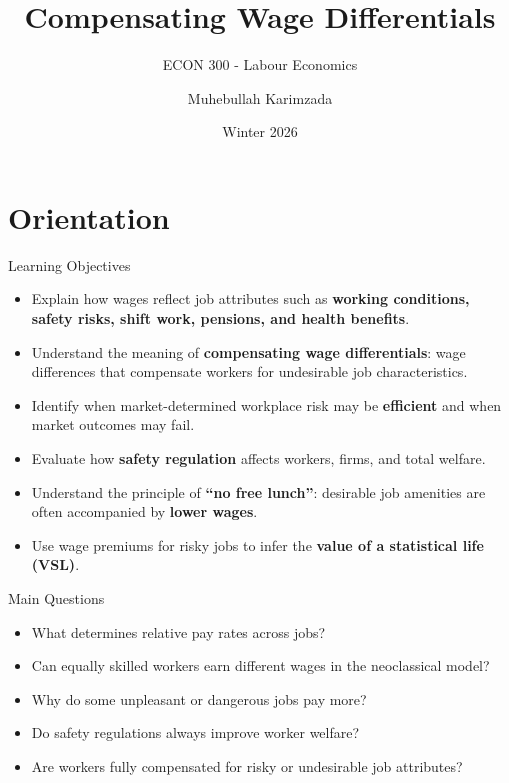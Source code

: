 \documentclass[aspectratio=169]{beamer}
\title{\textbf{Compensating Wage Differentials \vspace{.5cm}\\  }}
\subtitle{{\large ECON 300 - Labour Economics}}
\author{Muhebullah Karimzada}
\date{Winter 2026}
\begin{document}
\begin{frame}[plain]
  \titlepage
\end{frame}

\section{Orientation}

\begin{frame}{Learning Objectives}
\transfade
\begin{itemize}[<+->]
  \item Explain how wages reflect job attributes such as \textbf{working conditions, safety risks, shift work, pensions, and health benefits}.
  \item Understand the meaning of \textbf{compensating wage differentials}: wage differences that compensate workers for undesirable job characteristics.
  \item Identify when market-determined workplace risk may be \textbf{efficient} and when market outcomes may fail.
  \item Evaluate how \textbf{safety regulation} affects workers, firms, and total welfare.
  \item Understand the principle of \textbf{``no free lunch''}: desirable job amenities are often accompanied by \textbf{lower wages}.
  \item Use wage premiums for risky jobs to infer the \textbf{value of a statistical life (VSL)}.
\end{itemize}
\end{frame}

\begin{frame}{Main Questions}
\transfade
\begin{itemize}[<+->]
  \item What determines relative pay rates across jobs?
  \item Can equally skilled workers earn different wages in the neoclassical model?
  \item Why do some unpleasant or dangerous jobs pay more?
  \item Do safety regulations always improve worker welfare?
  \item Are workers fully compensated for risky or undesirable job attributes?
\end{itemize}
\end{frame}
\end{document}
